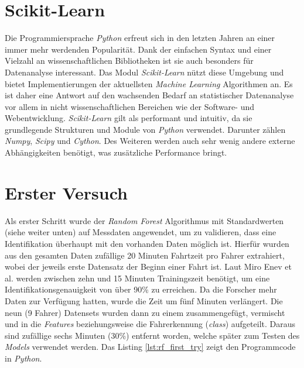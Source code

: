 \section{Scikit-Learn}
\label{sec:sk_learn}

Die Programmiersprache \textit{Python} erfreut sich in den letzten Jahren an einer immer mehr werdenden Popularität. Dank der einfachen Syntax und einer Vielzahl an wissenschaftlichen Bibliotheken ist sie auch besonders für Datenanalyse interessant. Das Modul \textit{Scikit-Learn} \cite{scikit-learn} nützt diese Umgebung und bietet Implementierungen der aktuellsten \textit{Machine Learning} Algorithmen an. Es ist daher eine Antwort auf den wachsenden Bedarf an statistischer Datenanalyse vor allem in nicht wissenschaftlichen Bereichen wie der Software- und Webentwicklung. \textit{Scikit-Learn} gilt als performant und intuitiv, da sie grundlegende Strukturen und Module von \textit{Python} verwendet. Darunter zählen \textit{Numpy}, \textit{Scipy} und \textit{Cython}. Des Weiteren werden auch sehr wenig andere externe Abhängigkeiten benötigt, was zusätzliche Performance bringt.

\section{Erster Versuch}

Als erster Schritt wurde der \textit{Random Forest} Algorithmus mit Standardwerten (siehe weiter unten) auf Messdaten angewendet, um zu validieren, dass eine Identifikation überhaupt mit den vorhanden Daten möglich ist. Hierfür wurden aus den gesamten Daten zufällige 20 Minuten Fahrtzeit pro Fahrer extrahiert, wobei der jeweils erste Datensatz der Beginn einer Fahrt ist. Laut Miro Enev et al. \cite{Enev2016} werden zwischen zehn und 15 Minuten Trainingszeit benötigt, um eine Identifikationsgenauigkeit von über 90\% zu erreichen. Da die Forscher mehr Daten zur Verfügung hatten, wurde die Zeit um fünf Minuten verlängert. Die neun (9 Fahrer) Datensets wurden dann zu einem zusammengefügt, vermischt und in die \textit{Features} beziehungsweise die Fahrerkennung (\textit{class}) aufgeteilt. Daraus sind zufällige sechs Minuten (30\%) entfernt worden, welche später zum Testen des \textit{Models} verwendet werden. Das Listing \ref{lst:rf_first_try} zeigt den Programmcode in \textit{Python}.

